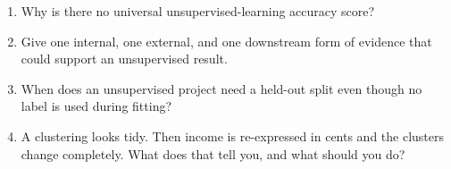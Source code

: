 \begin{quickcheck}
\begin{enumerate}
  \item Why is there no universal unsupervised-learning accuracy score?
  \item Give one internal, one external, and one downstream form of evidence that could support an unsupervised result.
  \item When does an unsupervised project need a held-out split even though no label is used during fitting?
  \item A clustering looks tidy. Then income is re-expressed in cents and the clusters change completely. What does that tell you, and what should you do?
\end{enumerate}
\end{quickcheck}
